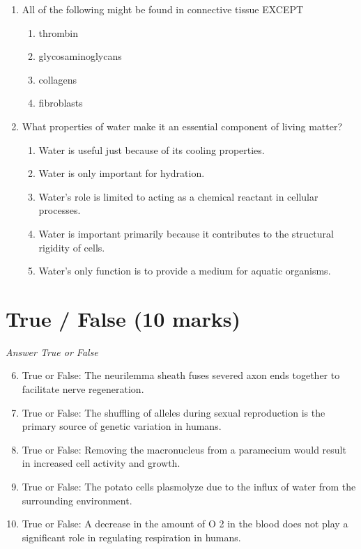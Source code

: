 \documentclass[12pt]{article}
\begin{document}
\begin{enumerate}[label=\arabic*.]
\begin{enumerate}[label=(\alph*)]
    \item the primary RNA transcript (after splicing) from the original DNA
    \item a single strand of the original DNA segment after a duplication mutation
\end{enumerate}
\item All of the following might be found in connective tissue EXCEPT
\begin{enumerate}[label=(\alph*)]
    \item thrombin
    \item glycosaminoglycans
    \item collagens
    \item fibroblasts
\end{enumerate}
\item What properties of water make it an essential component of living matter?
\begin{enumerate}[label=(\alph*)]
    \item Water is useful just because of its cooling properties.
    \item Water is only important for hydration.
    \item Water's role is limited to acting as a chemical reactant in cellular processes.
    \item Water is important primarily because it contributes to the structural rigidity of cells.
    \item Water's only function is to provide a medium for aquatic organisms.
\end{enumerate}
\end{enumerate}

\section*{True / False (10 marks)}
\textit{Answer True or False}
\begin{enumerate}[label=\arabic*.]
\setcounter{enumi}{5}
\item True or False: The neurilemma sheath fuses severed axon ends together to facilitate nerve regeneration.
\item True or False: The shuffling of alleles during sexual reproduction is the primary source of genetic variation in humans.
\item True or False: Removing the macronucleus from a paramecium would result in increased cell activity and growth.
\item True or False: The potato cells plasmolyze due to the influx of water from the surrounding environment.
\item True or False: A decrease in the amount of O 2 in the blood does not play a significant role in regulating respiration in humans.
\end{enumerate}
\end{document}
